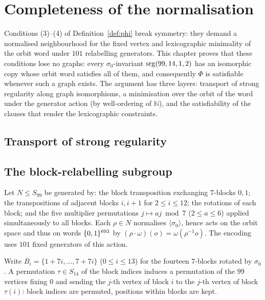 \chapter{Completeness of the normalisation}\label{sec:lex}

Conditions (3)--(4) of Definition~\ref{def:phi} break symmetry: they demand a
normalised neighbourhood for the fixed vertex and lexicographic minimality of
the orbit word under $101$ relabelling generators.  This chapter proves that
these conditions lose no graphs: every $\sigma_0$-invariant
$\mathrm{srg}(99,14,1,2)$ has an isomorphic copy whose orbit word satisfies all of
them, and consequently $\Phi$ is satisfiable whenever such a graph exists.
The argument has three layers: transport of strong regularity along graph
isomorphisms, a minimisation over the orbit of the word under the generator
action (by well-ordering of $\mathbb{N}$), and the satisfiability of the
clauses that render the lexicographic constraints.

\section{Transport of strong regularity}





\section{The block-relabelling subgroup}

\begin{definition}\label{def:relabel}
Let $N \le S_{99}$ be generated by: the block transposition exchanging
$7$-blocks $0,1$; the transpositions of adjacent blocks $i,i{+}1$ for
$2 \le i \le 12$; the rotations of each block; and the five multiplier
permutations $j \mapsto aj \bmod 7$ ($2 \le a \le 6$) applied simultaneously
to all blocks.  Each $\rho \in N$ normalises $\langle\sigma_0\rangle$, hence
acts on the orbit space and thus on words $\{0,1\}^{693}$ by
$(\rho\cdot\omega)(o) = \omega(\rho^{-1}o)$.  The encoding uses $101$ fixed
generators of this action.
\leanok
{}
\end{definition}

\begin{definition}\label{def:lex-cycle-relabel}
Write $B_i = \{1+7i,\dots,7+7i\}$ ($0 \le i \le 13$) for the fourteen
$7$-blocks rotated by $\sigma_0$.  A permutation $\tau \in S_{14}$ of the
block indices induces a permutation of the $99$ vertices fixing $0$ and
sending the $j$-th vertex of block $i$ to the $j$-th vertex of block
$\tau(i)$: block indices are permuted, positions within blocks are kept.
\leanok
{}
\end{definition}

